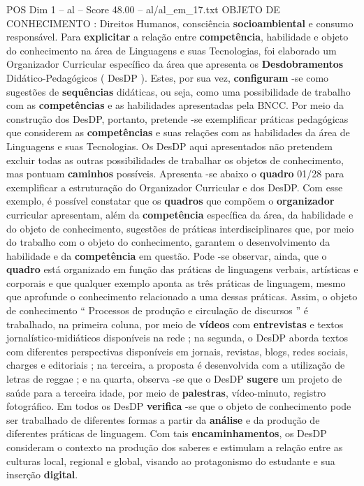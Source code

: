 \begin{textsample}{POS Dim 1 – al – Score 48.00 – al/al\_em\_17.txt}
OBJETO DE CONHECIMENTO : Direitos Humanos, consciência \textbf{socioambiental} e consumo responsável.
Para \textbf{explicitar} a relação entre \textbf{competência}, habilidade e objeto do conhecimento na área de Linguagens e suas Tecnologias, foi elaborado um Organizador Curricular específico da área que apresenta os \textbf{Desdobramentos} Didático-Pedagógicos ( DesDP ).
Estes, por sua vez, \textbf{configuram} -se como sugestões de \textbf{sequências} didáticas, ou seja, como uma possibilidade de trabalho com as \textbf{competências} e as habilidades apresentadas pela BNCC.
Por meio da construção dos DesDP, portanto, pretende -se exemplificar práticas pedagógicas que considerem as \textbf{competências} e suas relações com as habilidades da área de Linguagens e suas Tecnologias.
Os DesDP aqui apresentados não pretendem excluir todas as outras possibilidades de trabalhar os objetos de conhecimento, mas pontuam \textbf{caminhos} possíveis.
Apresenta -se abaixo o \textbf{quadro} 01/28 para exemplificar a estruturação do Organizador Curricular e dos DesDP.
Com esse exemplo, é possível constatar que os \textbf{quadros} que compõem o \textbf{organizador} curricular apresentam, além da \textbf{competência} específica da área, da habilidade e do objeto de conhecimento, sugestões de práticas interdisciplinares que, por meio do trabalho com o objeto do conhecimento, garantem o desenvolvimento da habilidade e da \textbf{competência} em questão.
Pode -se observar, ainda, que o \textbf{quadro} está organizado em função das práticas de linguagens verbais, artísticas e corporais e que qualquer exemplo aponta as três práticas de linguagem, mesmo que aprofunde o conhecimento relacionado a uma dessas práticas.
Assim, o objeto de conhecimento “ Processos de produção e circulação de discursos ” é trabalhado, na primeira coluna, por meio de \textbf{vídeos} com \textbf{entrevistas} e textos jornalístico-midiáticos disponíveis na rede ; na segunda, o DesDP aborda textos com diferentes perspectivas disponíveis em jornais, revistas, blogs, redes sociais, charges e editoriais ; na terceira, a proposta é desenvolvida com a utilização de letras de reggae ; e na quarta, observa -se que o DesDP \textbf{sugere} um projeto de saúde para a terceira idade, por meio de \textbf{palestras}, vídeo-minuto, registro fotográfico.
Em todos os DesDP \textbf{verifica} -se que o objeto de conhecimento pode ser trabalhado de diferentes formas a partir da \textbf{análise} e da produção de diferentes práticas de linguagem.
Com tais \textbf{encaminhamentos}, os DesDP consideram o contexto na produção dos saberes e estimulam a relação entre as culturas local, regional e global, visando ao protagonismo do estudante e sua inserção \textbf{digital}.

\end{textsample}
